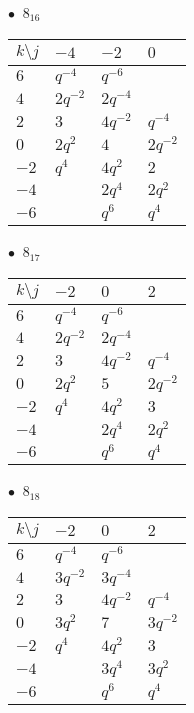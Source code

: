 %
\begin{minipage}{\linewidth}
$\bullet\ $ $8_{16}$ \vspace{0.5em} \\
\begin{tabular}{l|lll}
$k \setminus j$ & $-4$ & $-2$ & $0$ \\
\hline
$6$ & $q^{-4}$ & $q^{-6}$ &  \\
$4$ & $2q^{-2}$ & $2q^{-4}$ &  \\
$2$ & $3$ & $4q^{-2}$ & $q^{-4}$ \\
$0$ & $2q^{2}$ & $4$ & $2q^{-2}$ \\
$-2$ & $q^{4}$ & $4q^{2}$ & $2$ \\
$-4$ &  & $2q^{4}$ & $2q^{2}$ \\
$-6$ &  & $q^{6}$ & $q^{4}$ \\
\end{tabular}
\vspace{2em}
\end{minipage}
%
\begin{minipage}{\linewidth}
$\bullet\ $ $8_{17}$ \vspace{0.5em} \\
\begin{tabular}{l|lll}
$k \setminus j$ & $-2$ & $0$ & $2$ \\
\hline
$6$ & $q^{-4}$ & $q^{-6}$ &  \\
$4$ & $2q^{-2}$ & $2q^{-4}$ &  \\
$2$ & $3$ & $4q^{-2}$ & $q^{-4}$ \\
$0$ & $2q^{2}$ & $5$ & $2q^{-2}$ \\
$-2$ & $q^{4}$ & $4q^{2}$ & $3$ \\
$-4$ &  & $2q^{4}$ & $2q^{2}$ \\
$-6$ &  & $q^{6}$ & $q^{4}$ \\
\end{tabular}
\vspace{2em}
\end{minipage}
%
\begin{minipage}{\linewidth}
$\bullet\ $ $8_{18}$ \vspace{0.5em} \\
\begin{tabular}{l|lll}
$k \setminus j$ & $-2$ & $0$ & $2$ \\
\hline
$6$ & $q^{-4}$ & $q^{-6}$ &  \\
$4$ & $3q^{-2}$ & $3q^{-4}$ &  \\
$2$ & $3$ & $4q^{-2}$ & $q^{-4}$ \\
$0$ & $3q^{2}$ & $7$ & $3q^{-2}$ \\
$-2$ & $q^{4}$ & $4q^{2}$ & $3$ \\
$-4$ &  & $3q^{4}$ & $3q^{2}$ \\
$-6$ &  & $q^{6}$ & $q^{4}$ \\
\end{tabular}
\vspace{2em}
\end{minipage}
